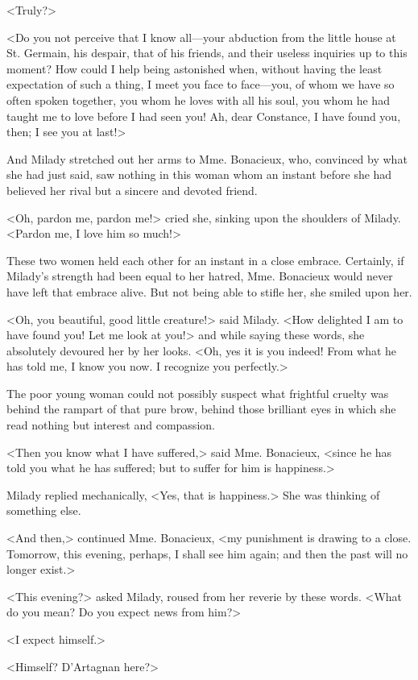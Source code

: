 <Truly?> 

<Do you not perceive that I know all---your abduction from the little house at St. Germain, his despair, that of his friends, and their useless inquiries up to this moment? How could I help being astonished when, without having the least expectation of such a thing, I meet you face to face---you, of whom we have so often spoken together, you whom he loves with all his soul, you whom he had taught me to love before I had seen you! Ah, dear Constance, I have found you, then; I see you at last!> 

And Milady stretched out her arms to Mme. Bonacieux, who, convinced by what she had just said, saw nothing in this woman whom an instant before she had believed her rival but a sincere and devoted friend. 

<Oh, pardon me, pardon me!> cried she, sinking upon the shoulders of Milady. <Pardon me, I love him so much!> 

These two women held each other for an instant in a close embrace. Certainly, if Milady's strength had been equal to her hatred, Mme. Bonacieux would never have left that embrace alive. But not being able to stifle her, she smiled upon her. 

<Oh, you beautiful, good little creature!> said Milady. <How delighted I am to have found you! Let me look at you!> and while saying these words, she absolutely devoured her by her looks. <Oh, yes it is you indeed! From what he has told me, I know you now. I recognize you perfectly.> 

The poor young woman could not possibly suspect what frightful cruelty was behind the rampart of that pure brow, behind those brilliant eyes in which she read nothing but interest and compassion. 

<Then you know what I have suffered,> said Mme. Bonacieux, <since he has told you what he has suffered; but to suffer for him is happiness.> 

Milady replied mechanically, <Yes, that is happiness.> She was thinking of something else. 

<And then,> continued Mme. Bonacieux, <my punishment is drawing to a close. Tomorrow, this evening, perhaps, I shall see him again; and then the past will no longer exist.> 

<This evening?> asked Milady, roused from her reverie by these words. <What do you mean? Do you expect news from him?> 

<I expect himself.> 

<Himself? D'Artagnan here?> 

